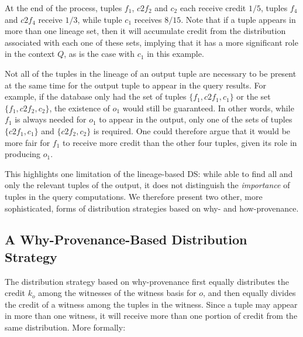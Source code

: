 At the end of the process, tuples $f_1$, $c2f_2$ and $c_2$ each receive credit $1/5$, tuples $f_4$ and $c2f_4$ receive $1/3$, while tuple $c_1$ receives $8/15$.  
Note that if a tuple appears in more than one lineage set, then it will accumulate credit from the distribution associated with each one of these sets, implying that it has a more significant role in the context $Q$, as is the case with $c_1$ in this example.
 
Not all of the tuples in the lineage of an output tuple are necessary to be present at the same time for the output tuple to appear in the query results.  For example, if the database only had the set of  tuples $\{f_1, c2f_1, c_1\}$ or the set $\{f_1, c2f_2, c_2\}$, the existence of $o_1$ would still be guaranteed. 
In other words, while $f_1$ is always needed for $o_1$ to appear in the output, 
only one of the sets of tuples $\{ c2f_1, c_1 \}$ and $\{ c2f_2, c_2 \}$ is required. 
One could therefore argue that it would be more fair for $f_1$ to receive more credit than the other four tuples, given its role in producing $o_1$.  

This highlights one limitation of the lineage-based DS: while able to find all and only the relevant tuples of the output, it does not distinguish the \emph{importance} of tuples in the query computations. 
We therefore present two other, more sophisticated, forms of distribution strategies based on why- and how-provenance.

\subsection{A Why-Provenance-Based Distribution Strategy}
The distribution strategy based on why-provenance first equally distributes the credit $k_o$ among the witnesses of the witness basis for $o$, and then equally divides the credit of a witness among the tuples in the witness. 
Since a tuple may appear in more than one witness, it will receive more than one portion of credit from the same distribution. More formally:


